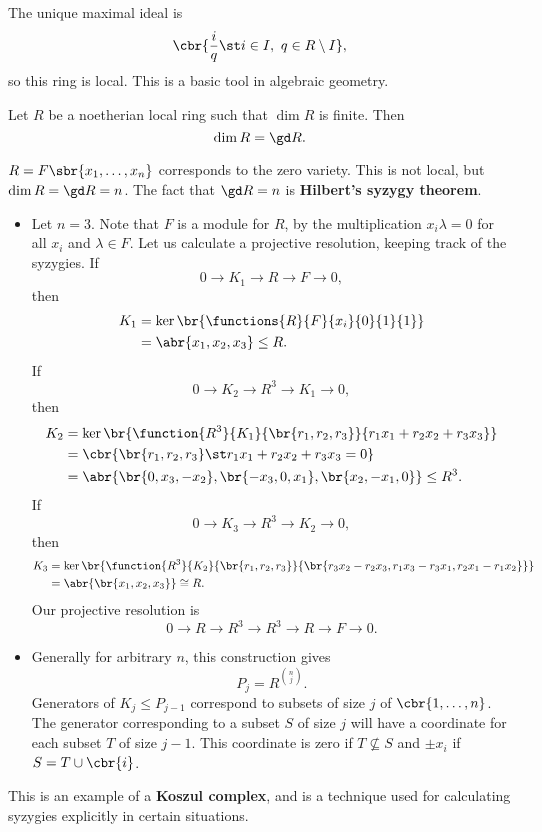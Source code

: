 The unique maximal ideal is
$$ \cbr{\dfrac{i}{q} \st i \in I, \ q \in R \setminus I}, $$
so this ring is local. This is a basic tool in algebraic geometry.

\begin{theorem}[Serre]
Let $ R $ be a noetherian local ring such that $ \dim R $ is finite. Then
$$ \dim R = \gd R. $$
\end{theorem}

\begin{example*}
$ R = F\sbr{x_1, \dots, x_n} $ corresponds to the zero variety. This is not local, but $ \dim R = \gd R = n $. The fact that $ \gd R = n $ is \textbf{Hilbert's syzygy theorem}.
\begin{itemize}
\item Let $ n = 3 $. Note that $ F $ is a module for $ R $, by the multiplication $ x_i\lambda = 0 $ for all $ x_i $ and $ \lambda \in F $. Let us calculate a projective resolution, keeping track of the syzygies. If
$$ 0 \to K_1 \to R \to F \to 0, $$
then
\begin{align*}
K_1
& = \ker \br{\functions{R}{F}{x_i}{0}{1}{1}} \\
& = \abr{x_1, x_2, x_3}
\le R.
\end{align*}
If
$$ 0 \to K_2 \to R^3 \to K_1 \to 0, $$
then
\begin{align*}
K_2
& = \ker \br{\function{R^3}{K_1}{\br{r_1, r_2, r_3}}{r_1x_1 + r_2x_2 + r_3x_3}} \\
& = \cbr{\br{r_1, r_2, r_3} \st r_1x_1 + r_2x_2 + r_3x_3 = 0} \\
& = \abr{\br{0, x_3, -x_2}, \br{-x_3, 0, x_1}, \br{x_2, -x_1, 0}}
\le R^3.
\end{align*}
If
$$ 0 \to K_3 \to R^3 \to K_2 \to 0, $$
then
\begin{align*}
K_3
& = \ker \br{\function{R^3}{K_2}{\br{r_1, r_2, r_3}}{\br{r_3x_2 - r_2x_3, r_1x_3 - r_3x_1, r_2x_1 - r_1x_2}}} \\
& = \abr{\br{x_1, x_2, x_3}}
\cong R.
\end{align*}
Our projective resolution is
$$ 0 \to R \to R^3 \to R^3 \to R \to F \to 0. $$
\item Generally for arbitrary $ n $, this construction gives
$$ P_j = R^{\binom{n}{j}}. $$
Generators of $ K_j \le P_{j - 1} $ correspond to subsets of size $ j $ of $ \cbr{1, \dots, n} $. The generator corresponding to a subset $ S $ of size $ j $ will have a coordinate for each subset $ T $ of size $ j - 1 $. This coordinate is zero if $ T \not\subseteq S $ and $ \pm x_i $ if $ S = T \cup \cbr{i} $.
\end{itemize}
This is an example of a \textbf{Koszul complex}, and is a technique used for calculating syzygies explicitly in certain situations.
\end{example*}

